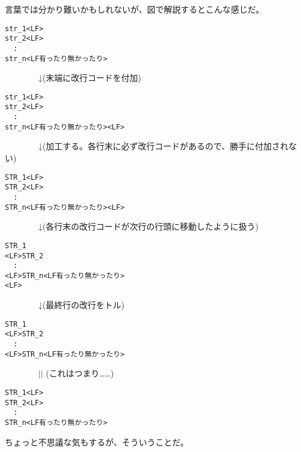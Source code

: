 言葉では分かり難いかもしれないが、図で解説するとこんな感じだ。

\begin{verbatim}
str_1<LF>
str_2<LF>
  :
str_n<LF有ったり無かったり>
\end{verbatim}

\noindent
　　　　↓(末端に改行コードを付加)

\begin{verbatim}
str_1<LF>
str_2<LF>
  :
str_n<LF有ったり無かったり><LF>
\end{verbatim}

\noindent
　　　　↓(加工する。各行末に必ず改行コードがあるので、勝手に付加されない)

\begin{verbatim}
STR_1<LF>
STR_2<LF>
  :
STR_n<LF有ったり無かったり><LF>
\end{verbatim}

\noindent
　　　　↓(各行末の改行コードが次行の行頭に移動したように扱う)

\begin{verbatim}
STR_1
<LF>STR_2
  :
<LF>STR_n<LF有ったり無かったり>
<LF>
\end{verbatim}

\noindent
　　　　↓(最終行の改行をトル)

\begin{verbatim}
STR_1
<LF>STR_2
  :
<LF>STR_n<LF有ったり無かったり>
\end{verbatim}

\noindent
　　　　$||$ (これはつまり……)

\begin{verbatim}
STR_1<LF>
STR_2<LF>
  :
STR_n<LF有ったり無かったり>
\end{verbatim}

ちょっと不思議な気もするが、そういうことだ。
